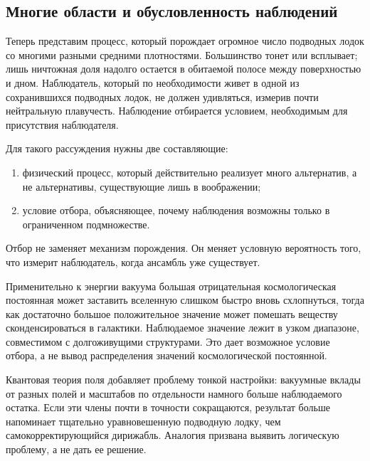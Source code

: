 \subsection{Многие области и обусловленность наблюдений}

Теперь представим процесс, который порождает огромное число подводных лодок со многими разными средними плотностями. Большинство тонет или всплывает; лишь ничтожная доля надолго остается в обитаемой полосе между поверхностью и дном. Наблюдатель, который по необходимости живет в одной из сохранившихся подводных лодок, не должен удивляться, измерив почти нейтральную плавучесть. Наблюдение отбирается условием, необходимым для присутствия наблюдателя.

Для такого рассуждения нужны две составляющие:
\begin{enumerate}
\item физический процесс, который действительно реализует много альтернатив, а не альтернативы, существующие лишь в воображении;
\item условие отбора, объясняющее, почему наблюдения возможны только в ограниченном подмножестве.
\end{enumerate}
Отбор не заменяет механизм порождения. Он меняет условную вероятность того, что измерит наблюдатель, когда ансамбль уже существует.

\begin{classroomqa}
\end{classroomqa}

Применительно к энергии вакуума большая отрицательная космологическая постоянная может заставить вселенную слишком быстро вновь схлопнуться, тогда как достаточно большое положительное значение может помешать веществу сконденсироваться в галактики. Наблюдаемое значение лежит в узком диапазоне, совместимом с долгоживущими структурами. Это дает возможное условие отбора, а не вывод распределения значений космологической постоянной.

Квантовая теория поля добавляет проблему тонкой настройки: вакуумные вклады от разных полей и масштабов по отдельности намного больше наблюдаемого остатка. Если эти члены почти в точности сокращаются, результат больше напоминает тщательно уравновешенную подводную лодку, чем самокорректирующийся дирижабль. Аналогия призвана выявить логическую проблему, а не дать ее решение.

